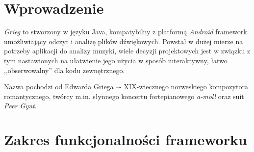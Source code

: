 \chapter{Wprowadzenie}

\emph{Grieg} to stworzony w języku Java, kompatybilny z platformą \textit{Android} framework
umożliwiający odczyt i analizę plików dźwiękowych. Powstał w dużej mierze na potrzeby aplikacji do
analizy muzyki, wiele decyzji projektowych jest w związku z tym nastawionych na ułatwienie jego
użycia w sposób interaktywny, łatwo ,,obserwowalny'' dla kodu zewnętrznego.

Nazwa pochodzi od Edwarda Griega –- XIX-wiecznego norweskiego kompozytora romantycznego, twórcy
m.in.  słynnego koncertu fortepianowego \textit{a-moll} oraz suit \textit{Peer Gynt}.

\chapter{Zakres funkcjonalności frameworku}
